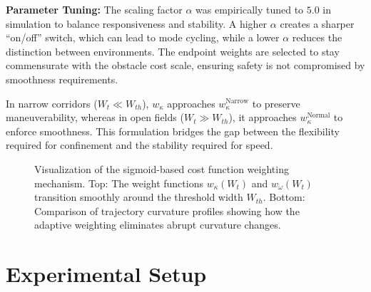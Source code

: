 \documentclass[lettersize,journal]{IEEEtran}
\begin{document}
\textbf{Parameter Tuning:} The scaling factor $\alpha$ was empirically tuned to $5.0$ in simulation to balance responsiveness and stability. A higher $\alpha$ creates a sharper ``on/off'' switch, which can lead to mode cycling, while a lower $\alpha$ reduces the distinction between environments. The endpoint weights are selected to stay commensurate with the obstacle cost scale, ensuring safety is not compromised by smoothness requirements.

In narrow corridors ($W_t \ll W_{th}$), $w_{\kappa}$ approaches $w_{\kappa}^{\text{Narrow}}$ to preserve maneuverability, whereas in open fields ($W_t \gg W_{th}$), it approaches $w_{\kappa}^{\text{Normal}}$ to enforce smoothness. This formulation bridges the gap between the flexibility required for confinement and the stability required for speed.

\begin{figure}[!t]
\centering
\caption{Visualization of the sigmoid-based cost function weighting mechanism. Top: The weight functions $w_\kappa(W_t)$ and $w_{\dot{\omega}}(W_t)$ transition smoothly around the threshold width $W_{th}$. Bottom: Comparison of trajectory curvature profiles showing how the adaptive weighting eliminates abrupt curvature changes.}
\label{fig:sigmoid_weights}
\end{figure}


\section{Experimental Setup}
\end{document}
